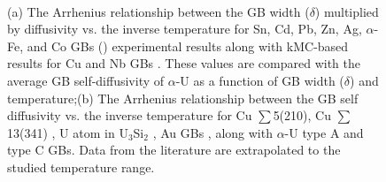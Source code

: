 \documentclass[review]{elsarticle}
\providecommand{\DIFaddbeginFL}{} %
\providecommand{\DIFaddendFL}{} %
\providecommand{\DIFdelbeginFL}{} %
\providecommand{\DIFdelendFL}{} %
\newcommand{\DIFscaledelfig}{0.5}
\newlength{\DIFdelgraphicswidth} %
\newlength{\DIFdelgraphicsheight} %
\newcommand{\DIFaddincludegraphics}[2][]{{\color{blue}\fbox{\DIFOincludegraphics[#1]{#2}}}} %
\newcommand{\DIFdelincludegraphics}[2][]{%
\sbox{\DIFdelgraphicsbox}{\DIFOincludegraphics[#1]{#2}}%
\settoboxwidth{\DIFdelgraphicswidth}{\DIFdelgraphicsbox} %
\settoboxtotalheight{\DIFdelgraphicsheight}{\DIFdelgraphicsbox} %
\scalebox{\DIFscaledelfig}{%
\parbox[b]{\DIFdelgraphicswidth}{\usebox{\DIFdelgraphicsbox}\\[-\baselineskip] \rule{\DIFdelgraphicswidth}{0em}}\llap{\resizebox{\DIFdelgraphicswidth}{\DIFdelgraphicsheight}{%
\setlength{\unitlength}{\DIFdelgraphicswidth}%
\begin{picture}(1,1)%
\thicklines\linethickness{2pt} %
{\color[rgb]{1,0,0}\put(0,0){\framebox(1,1){}}}%
{\color[rgb]{1,0,0}\put(0,0){\line( 1,1){1}}}%
{\color[rgb]{1,0,0}\put(0,1){\line(1,-1){1}}}%
\end{picture}%
}\hspace*{3pt}}} %
} %
\DeclareRobustCommand{\DIFaddbeginFL}{\DIFOaddbeginFL \let\includegraphics\DIFaddincludegraphics} %
\DeclareRobustCommand{\DIFaddendFL}{\DIFOaddendFL \let\includegraphics\DIFOincludegraphics} %
\DeclareRobustCommand{\DIFdelbeginFL}{\DIFOdelbeginFL \let\includegraphics\DIFdelincludegraphics} %
\DeclareRobustCommand{\DIFdelendFL}{\DIFOaddendFL \let\includegraphics\DIFOincludegraphics} %
\begin{document}
\begin{figure}[h!]
\centering
\DIFdelbeginFL %
\DIFdelendFL \DIFaddbeginFL {}
\DIFaddendFL \\
\caption{(a) The Arrhenius relationship between the GB width ($\delta$) multiplied by diffusivity vs. the inverse temperature for Sn, Cd, Pb, Zn, Ag, $\alpha$-Fe, and Co GBs (\cite{diffusion_compare}) experimental results along with kMC-based results for Cu and Nb GBs \cite{cu_nb}. These values are compared with the average GB self-diffusivity of $\alpha$-U as a function of GB width ($\delta$) and temperature;(b) The Arrhenius relationship between the GB self diffusivity vs. the inverse temperature for Cu $\sum$5(210), Cu $\sum$13(341) \cite{Suzuki2003}, U atom in U$_\mathrm{3}$Si$_\mathrm{2}$ \cite{COOPER2021153129}, Au GBs \cite{diffusion_compare}, along with $\alpha$-U type A and type C GBs. Data from the literature are extrapolated to the studied temperature range.}
\label{fig:diff_comp}
\end{figure}
\end{document}
